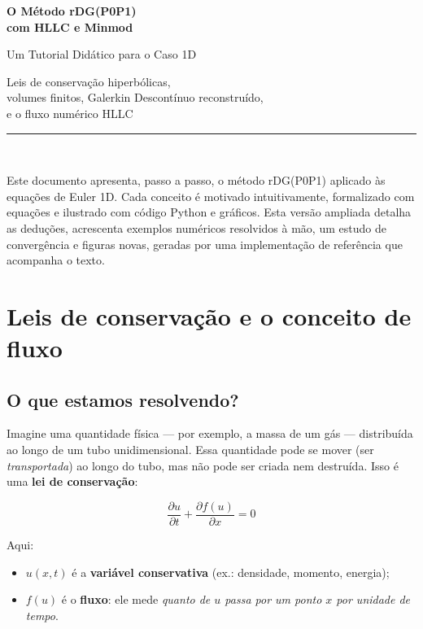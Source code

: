 \documentclass[10pt,a4paper]{article}
\newcommand{\pd}[2]{\frac{\partial #1}{\partial #2}}
\begin{document}
\begin{titlepage}
\centering
\vspace*{4.5cm}
{\Huge\bfseries\color{azul} O Método rDG(P0P1)\\[0.4cm] com HLLC e Minmod\par}
\vspace{1.2cm}
{\Large\color{azulclaro} Um Tutorial Didático para o Caso 1D\par}
\vspace{2.2cm}
{\large Leis de conservação hiperbólicas,\\ volumes finitos, Galerkin Descontínuo reconstruído,\\ e o fluxo numérico HLLC\par}
\vspace{2.8cm}
\rule{\textwidth}{0.4pt}\\[0.5cm]
\parbox{0.92\textwidth}{\centering Este documento apresenta, passo a passo, o método rDG(P0P1) aplicado às equações de Euler 1D. Cada conceito é motivado intuitivamente, formalizado com equações e ilustrado com código Python e gráficos. Esta versão ampliada detalha as deduções, acrescenta exemplos numéricos resolvidos à mão, um estudo de convergência e figuras novas, geradas por uma implementação de referência que acompanha o texto.}
\vfill
\end{titlepage}

\setcounter{page}{1}
\tableofcontents
\newpage

\section{Leis de conservação e o conceito de fluxo}

\subsection{O que estamos resolvendo?}

Imagine uma quantidade física --- por exemplo, a massa de um gás --- distribuída ao longo de um tubo unidimensional. Essa quantidade pode se mover (ser \emph{transportada}) ao longo do tubo, mas não pode ser criada nem destruída. Isso é uma \textbf{lei de conservação}:
\begin{destaque}
\begin{equation}\label{eq:lei}
\pd{u}{t}+\pd{f(u)}{x}=0
\end{equation}
\end{destaque}
Aqui:
\begin{itemize}[leftmargin=2.2em,itemsep=2pt]
\item[] $u(x,t)$ é a \textbf{variável conservativa} (ex.: densidade, momento, energia);
\item[] $f(u)$ é o \textbf{fluxo}: ele mede \emph{quanto de $u$ passa por um ponto $x$ por unidade de tempo}.
\end{itemize}
\end{document}
